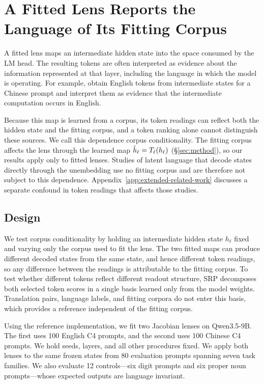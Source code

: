 \section{A Fitted Lens Reports the Language of Its Fitting Corpus}
\label{sec:beyond-token}
\label{sec:readout-analyses}
\label{subsec:cross-lens}

A fitted lens maps an intermediate hidden state into the space consumed
by the LM head. The resulting tokens are often interpreted as evidence
about the information represented at that layer, including the language
in which the model is operating. For example,
\citet{gurnee2026workspace} obtain English tokens from intermediate
states for a Chinese prompt and interpret them as evidence that the
intermediate computation occurs in English.

Because this map is learned from a corpus, its token readings can reflect
both the hidden state and the fitting corpus, and a token ranking alone
cannot distinguish these sources. We call this dependence corpus
conditionality. The fitting corpus affects the lens through the learned
map \(\tilde h_\ell=T_\ell(h_\ell)\) (\S\ref{sec:method}), so our results apply
only to fitted lenses. Studies of latent language that decode states
directly through the unembedding use no fitting corpus
\citep{wendler2024llamas,schut2025english} and are therefore not subject
to this dependence. Appendix~\ref{app:extended-related-work} discusses a
separate confound in token readings that affects those studies.

\subsection{Design}
\label{subsec:cross-lens-design}
We test corpus conditionality by holding an intermediate hidden state
\(h_\ell\) fixed and varying only the corpus used to fit the lens. The
two fitted maps can produce different decoded states from the same
state, and hence different token readings, so any difference between
the readings is attributable to the fitting corpus. To
test whether different tokens reflect different readout structure, SRP
decomposes both selected token scores in a single basis learned only
from the model weights. Translation pairs, language labels, and fitting
corpora do not enter this basis, which provides a reference independent
of the fitting corpus.

Using the reference implementation, we fit two Jacobian lenses
\citep{gurnee2026workspace} on Qwen3.5-9B. The first uses 100 English C4
prompts, and the second uses 100 Chinese C4 prompts. We hold seeds,
layers, and all other procedures fixed. We apply both lenses to the same
frozen states from 80 evaluation prompts spanning seven task families.
We also evaluate 12 controls---six digit prompts and six proper noun
prompts---whose expected outputs are language invariant.

